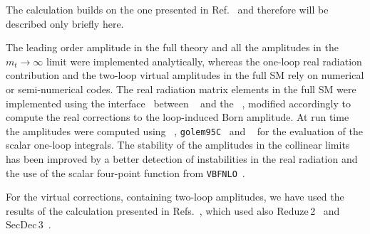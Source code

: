The calculation builds on the one presented in Ref.~\cite{Heinrich:2017kxx} and therefore will be described only briefly here. 

The leading order amplitude in the full theory and  all the
amplitudes in the $m_t\to\infty$ limit were implemented analytically, whereas the
one-loop real radiation contribution and the two-loop virtual
amplitudes in the full SM rely on numerical or semi-numerical
codes.
The real radiation matrix elements in the full SM were implemented
using the interface~\cite{Luisoni:2013cuh}
between \gosam~\cite{Cullen:2011ac,Cullen:2014yla} and
the \powhegbox~\cite{Nason:2004rx,Frixione:2007vw,Alioli:2010xd}, modified
accordingly to compute the real corrections to the loop-induced Born amplitude. 
 At run time the amplitudes were computed using
\ninja{}~\cite{Peraro:2014cba},  {\tt golem95C}~\cite{Binoth:2008uq,Cullen:2011kv} and \avholo{}~\cite{vanHameren:2010cp}
for the evaluation of the scalar one-loop integrals.
The stability of the amplitudes in the collinear limits has been improved by a better detection of instabilities in the real radiation 
and the use of the scalar four-point function from {\tt VBFNLO}~\cite{Arnold:2008rz,Baglio:2014uba}.

For the virtual corrections, containing two-loop amplitudes, we have used the results of the
calculation presented in Refs.~\cite{Borowka:2016ehy,Borowka:2016ypz},
which used also {\sc Reduze}\,2~\cite{vonManteuffel:2012np} and {\sc
 SecDec}\,3~\cite{Borowka:2015mxa}.

